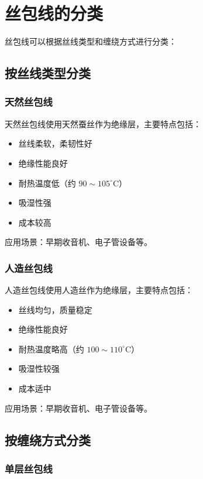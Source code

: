 \documentclass[12pt,UTF8]{ctexbook}
\begin{document}
\section{丝包线的分类}

丝包线可以根据丝线类型和缠绕方式进行分类：

\subsection{按丝线类型分类}

\subsubsection{天然丝包线}

天然丝包线使用天然蚕丝作为绝缘层，主要特点包括：

\begin{itemize}[leftmargin=2cm]
    \item 丝线柔软，柔韧性好
    \item 绝缘性能良好
    \item 耐热温度低（约 $90 \sim 105^\circ$C）
    \item 吸湿性强
    \item 成本较高
\end{itemize}

应用场景：早期收音机、电子管设备等。

\subsubsection{人造丝包线}

人造丝包线使用人造丝作为绝缘层，主要特点包括：

\begin{itemize}[leftmargin=2cm]
    \item 丝线均匀，质量稳定
    \item 绝缘性能良好
    \item 耐热温度略高（约 $100 \sim 110^\circ$C）
    \item 吸湿性较强
    \item 成本适中
\end{itemize}

应用场景：早期收音机、电子管设备等。

\subsection{按缠绕方式分类}

\subsubsection{单层丝包线}
\end{document}
